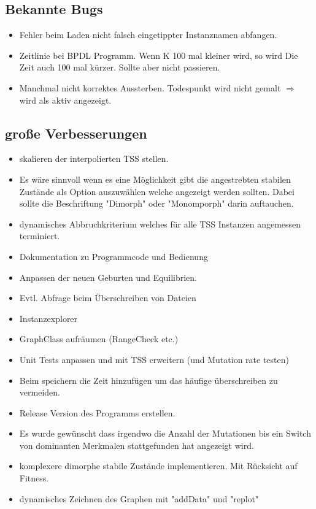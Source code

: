 \documentclass{article}
\begin{document}
\subsection{Bekannte Bugs}
	\begin{itemize}
		\item Fehler beim Laden nicht falsch eingetippter Instanznamen abfangen.
		\item Zeitlinie bei BPDL Programm. Wenn K 100 mal kleiner wird, so wird Die Zeit auch 100 mal kürzer. Sollte aber nicht passieren.
		\item Manchmal nicht korrektes Aussterben. Todespunkt wird nicht gemalt $ \Rightarrow $ wird als aktiv angezeigt.
	\end{itemize}
	
\subsection{große Verbesserungen}
	\begin{itemize}
		\item skalieren der interpolierten TSS stellen.
		\item Es wäre sinnvoll wenn es eine Möglichkeit gibt die angestrebten stabilen Zustände als Option auszuwählen welche angezeigt werden sollten. Dabei sollte die Beschriftung "{}Dimorph"{} oder "{}Monomporph"{} darin auftauchen.
		\item dynamisches Abbruchkriterium welches für alle TSS Instanzen angemessen terminiert.
		\item Dokumentation zu Programmcode und Bedienung
		\item Anpassen der neuen Geburten und Equilibrien.
		\item Evtl. Abfrage beim Überschreiben von Dateien
		\item Instanzexplorer
		\item GraphClass aufräumen (RangeCheck etc.)
		\item Unit Tests anpassen und mit TSS erweitern (und Mutation rate testen)
		\item Beim speichern die Zeit hinzufügen um das häufige überschreiben zu vermeiden.
		\item Release Version des Programms erstellen.
		\item Es wurde gewünscht dass irgendwo die Anzahl der Mutationen bis ein Switch von dominanten Merkmalen stattgefunden hat angezeigt wird.
		\item komplexere dimorphe stabile Zustände implementieren. Mit Rücksicht auf Fitness.
		\item dynamisches Zeichnen des Graphen mit "{}addData"{} und "{}replot"{}
	\end{itemize}
\end{document}
